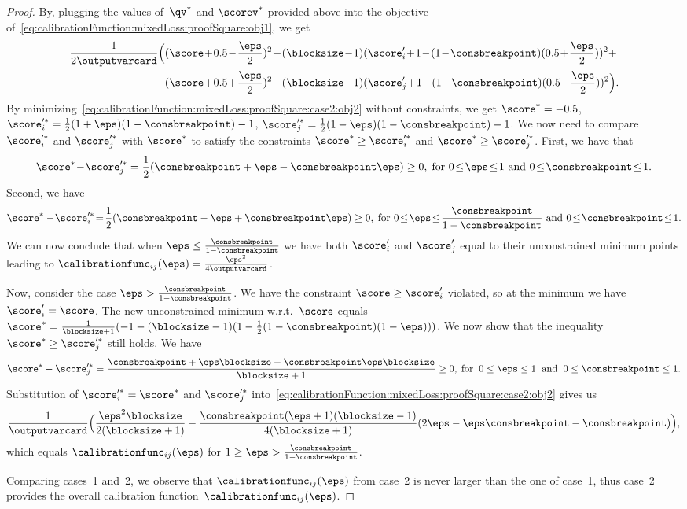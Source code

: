 \documentclass{article}
\begin{document}
\begin{proof}
    By, plugging the values of~$\qv^*$ and $\scorev^*$ provided above into the objective of~\eqref{eq:calibrationFunction:mixedLoss:proofSquare:obj1}, we get
    \begin{align}
    \notag
    \frac{1}{2\outputvarcard}\Bigl(  
    &(\score \!+\! 0.5 \!-\! \frac{\eps}{2})^2
    \!+\!
    (\blocksize\!-\!1)(\score_i' \!+\! 1\!-\!(1\!-\!\consbreakpoint)(0.5\!+\!\frac{\eps}{2}))^2
    + \\
    \label{eq:calibrationFunction:mixedLoss:proofSquare:case2:obj2}
    &(\score \!+\! 0.5 \!+\! \frac{\eps}{2})^2
    \!+\!
    (\blocksize\!-\!1)(\score_j' \!+\! 1\!-\!(1\!-\!\consbreakpoint)(0.5\!-\!\frac{\eps}{2}))^2
    \Bigr).
    \end{align}
    By minimizing~\eqref{eq:calibrationFunction:mixedLoss:proofSquare:case2:obj2} without constraints, we get $\score^*=-0.5$, $\score_i'^*=\frac12(1+\eps)(1-\consbreakpoint)-1$, $\score_j'^*=\frac12(1-\eps)(1-\consbreakpoint)-1$.
    We now need to compare $\score_i'^*$ and $\score_j'^*$ with $\score^*$ to satisfy the constraints $\score^* \geq \score_i'^*$ and $\score^* \geq \score_j'^*$.
    First, we have that
    \[
    \score^*\!-\!\score_j'^* = \frac12(\consbreakpoint+\eps-\consbreakpoint\eps) \geq 0,\; \text{for $0\!\leq\!\eps\!\leq\!1$ and $0\!\leq\!\consbreakpoint\!\leq\!1$}.
    \]
    Second, we have 
    \[
    \score^*-\! \score_i'^* \!=\! \frac12(\consbreakpoint-\eps+\consbreakpoint\eps) \geq 0,\; \text{for $0\!\leq\!\eps\!\leq\!\frac{\consbreakpoint}{1-\consbreakpoint}$ and $0\!\leq\!\consbreakpoint\!\leq\! 1$}.
    \]
    We can now conclude that when $\eps\leq\frac{\consbreakpoint}{1-\consbreakpoint}$ we have both $\score_i'$ and $\score_j'$ equal to their unconstrained minimum points leading to $\calibrationfunc_{ij}(\eps)=\frac{\eps^2}{4\outputvarcard}$.
    
    Now, consider the case $\eps>\frac{\consbreakpoint}{1-\consbreakpoint}$.
    We have the constraint $\score \geq \score_i'$ violated, so at the minimum we have $\score_i'= \score$. The new unconstrained minimum w.r.t.~$\score$ equals $\score^* = \frac{1}{\blocksize+1}(-1-(\blocksize-1)(1- \frac12(1-\consbreakpoint)(1-\eps)))$.
    We now show that the inequality $\score^* \geq \score_j'^*$ still holds. 
    We have
    \[
    \score^* - \score_j'^* = \frac{\consbreakpoint+\eps \blocksize - \consbreakpoint \eps \blocksize}{\blocksize+1} \geq 0, \; \text{for \:$0\leq\eps\leq 1$ \:and \:$0\leq \consbreakpoint \leq 1$}.
    \]
    Substitution of $\score_i'^*=\score^*$ and $\score_j'^*$ into~\eqref{eq:calibrationFunction:mixedLoss:proofSquare:case2:obj2} gives us 
    \[
    \frac{1}{\outputvarcard} \Bigl( \frac{\eps^2 \blocksize}{2(\blocksize+1)} - \frac{\consbreakpoint(\eps+1)(\blocksize-1)}{4(\blocksize+1)}(2\eps - \eps \consbreakpoint - \consbreakpoint)\Bigr),
    \]
    which equals $\calibrationfunc_{ij}(\eps)$ for $1\geq \eps>\frac{\consbreakpoint}{1-\consbreakpoint}$.
    
    Comparing cases~1 and~2, we observe that $\calibrationfunc_{ij}(\eps)$ from case~2 is never larger than the one of case~1, thus case~2 provides the overall calibration function~$\calibrationfunc_{ij}(\eps)$.
\end{proof}
\end{document}

